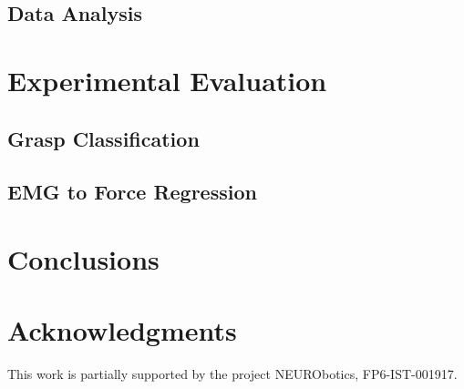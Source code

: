 \documentclass[journal]{IEEEtran}
\begin{document}
\subsection{Data Analysis}
\label{subsec:analysis}


\section{Experimental Evaluation}
\label{sec:exp}


\subsection{Grasp Classification}
\label{subsec:classification}


\subsection{EMG to Force Regression}
\label{subsec:regression}


\section{Conclusions}
\label{sec:conclusions}


\section*{Acknowledgments}

This work is partially supported by the project NEURObotics,
FP6-IST-001917.

{\small


}



\end{document}
